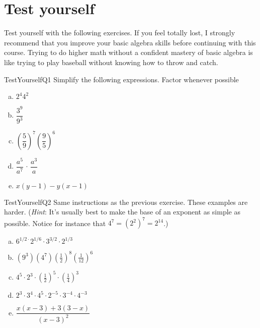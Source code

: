 \section{Test yourself}
Test yourself with the following exercises. If you feel totally lost, I strongly recommend that you improve your basic algebra skills before continuing with this course. Trying to do higher math without a confident mastery of basic algebra is like trying to play baseball without knowing how to throw and catch.

\begin{exercise}{TestYourselfQ1}
Simplify the following expressions. Factor whenever possible
\begin{multicols}{2}
\begin{enumerate}[(a)]
\item
$ 2^4 4^2$
\item
$ \dfrac{3^9}{9^3}$
\item
$\left( \dfrac{5}{9} \right)^7 \left( \dfrac{9}{5} \right)^6$
\item
$\dfrac{a^5}{a^7} \, \cdot \, \dfrac{a^3}{a}$
\item
$x(y-1) - y(x-1)$
\end{enumerate}
\end{multicols}
\end{exercise}



\begin{exercise}{TestYourselfQ2}
Same instructions as the previous exercise. These examples are  harder. (\emph{Hint}: It's usually best to make the base of an exponent as simple as possible. Notice for instance that $4^7 = (2^2)^7 = 2^{14}$.)
\begin{multicols}{2}
\begin{enumerate}[(a)]
\item
$6^{1/2\cdot}2^{1/6}\cdot3^{3/2}\cdot2^{1/3}$
\item
$(9^3)(4^7)\left(\frac{1}{2}\right)^8\left(\frac{1}{12}\right)^6$
\item
$4^5 \cdot 2^3 \cdot \left(\frac{1}{2}\right)^5 \cdot \left( \frac{1}{4} \right) ^3$
\item
$2^3 \cdot 3^4 \cdot 4^5 \cdot 2^{-5} \cdot 3^{-4} \cdot 4^{-3}$
\item
$\dfrac{x(x-3)+3(3-x)}{(x-3)^2}$
\end{enumerate}
\end{multicols}
\end{exercise}


